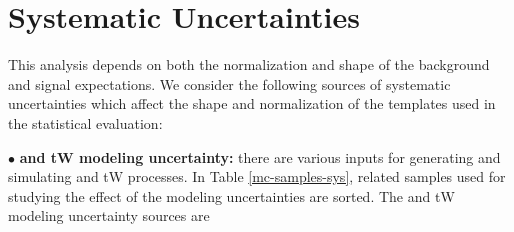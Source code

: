 \clearpage
\section{Systematic Uncertainties}
\label{tW_systematic}

This analysis depends on both the normalization and shape of the background and signal expectations.
We consider the following sources of systematic uncertainties which affect the shape and normalization of the templates used in the statistical evaluation:




$\bullet$ \textbf{\ttbar and tW modeling uncertainty:} there are various inputs for generating and simulating \ttbar and tW processes. In Table \ref{mc-samples-sys}, related samples used for studying the effect of the modeling uncertainties are sorted.
The \ttbar and tW modeling uncertainty sources are


